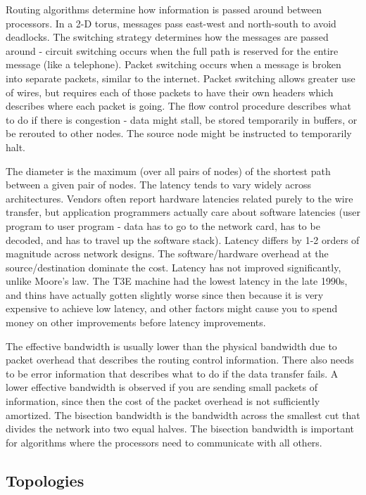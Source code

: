 \documentclass[10pt]{article}
\begin{document}
\begin{flushleft}
Routing algorithms determine how information is passed around between processors. In a 2-D torus, messages pass east-west and north-south to avoid deadlocks. The switching strategy determines how the messages are passed around - circuit switching occurs when the full path is reserved for the entire message (like a telephone). Packet switching occurs when a message is broken into separate packets, similar to the internet. Packet switching allows greater use of wires, but requires each of those packets to have their own headers which describes where each packet is going. The flow control procedure describes what to do if there is congestion - data might stall, be stored temporarily in buffers, or be rerouted to other nodes. The source node might be instructed to temporarily halt.

The diameter is the maximum (over all pairs of nodes) of the shortest path between a given pair of nodes. The latency tends to vary widely across architectures. Vendors often report hardware latencies related purely to the wire transfer, but application programmers actually care about software latencies (user program to user program - data has to go to the network card, has to be decoded, and has to travel up the software stack). Latency differs by 1-2 orders of magnitude across network designs. The software/hardware overhead at the source/destination dominate the cost. Latency has not improved significantly, unlike Moore's law. The T3E machine had the lowest latency in the late 1990s, and thins have actually gotten slightly worse since then because it is very expensive to achieve low latency, and other factors might cause you to spend money on other improvements before latency improvements.

The effective bandwidth is usually lower than the physical bandwidth due to packet overhead that describes the routing control information. There also needs to be error information that describes what to do if the data transfer fails. A lower effective bandwidth is observed if you are sending small packets of information, since then the cost of the packet overhead is not sufficiently amortized. The bisection bandwidth is the bandwidth across the smallest cut that divides the network into two equal halves. The bisection bandwidth is important for algorithms where the processors need to communicate with all others.

\subsection{Topologies}


\end{flushleft}
\end{document}
